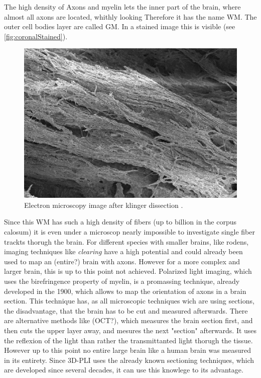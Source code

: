 The high density of Axons and myelin lets the inner part of the brain, where almost all axons are located, whithly looking
Therefore it has the name \ac{WM}.
The outer cell bodies layer are called \ac{GM}.
In a stained image this is visible (see \cref{fig:coronalStained}).
\par
% 
\begin{figure}[!t]
	\centering
	\includegraphics{gfx/neuroanatomy/human_wm_after_klinger_dissection.png}
	\caption{Electron microscopy image after klinger dissection \cite{destrieux:hal-01261930}.}
\end{figure}
% 
Since this \ac{WM} has such a high density of fibers (up to billion in the corpus calosum) it is even under a microscop nearly impossible to investigate single fiber trackts thorugh the brain.
For different species with smaller brains, like rodens, imaging techniques like \textit{clearing} have a high potential and could already been used to map an (entire?) brain with axons.
However for a more complex and larger brain, this is up to this point not achieved.
Polarized light imaging, which uses the birefringence property of myelin, is a promassing technique, already developed in the 1900, which allows to map the orientation of axons in a brain section.
This technique has, as all microscopic techniques wich are using sections, the disadvantage, that the brain has to be cut and measured afterwards.
There are alternative methods like (OCT?), which measures the brain section first, and then cuts the upper layer away, and mesures the next "section" afterwards. It uses the reflexion of the light than rather the transmittanted light thorugh the tissue.
However up to this point no entire large brain like a human brain was measured in its entirety.
Since \ac{3D-PLI} uses the already known sectioning techniques, which are developed since several decades, it can use this knowlege to its advantage.
% 
%
